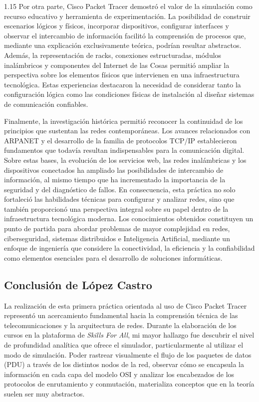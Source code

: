 \documentclass[11pt, a4paper]{article}
\begin{document}
\begin{spacing}{1.15}
Por otra parte, Cisco Packet Tracer demostró el valor de la simulación como recurso educativo y herramienta de experimentación. La posibilidad de construir escenarios lógicos y físicos, incorporar dispositivos, configurar interfaces y observar el intercambio de información facilitó la comprensión de procesos que, mediante una explicación exclusivamente teórica, podrían resultar abstractos. Además, la representación de racks, conexiones estructuradas, módulos inalámbricos y componentes del Internet de las Cosas permitió ampliar la perspectiva sobre los elementos físicos que intervienen en una infraestructura tecnológica. Estas experiencias destacaron la necesidad de considerar tanto la configuración lógica como las condiciones físicas de instalación al diseñar sistemas de comunicación confiables.

Finalmente, la investigación histórica permitió reconocer la continuidad de los principios que sustentan las redes contemporáneas. Los avances relacionados con ARPANET y el desarrollo de la familia de protocolos TCP/IP establecieron fundamentos que todavía resultan indispensables para la comunicación digital. Sobre estas bases, la evolución de los servicios web, las redes inalámbricas y los dispositivos conectados ha ampliado las posibilidades de intercambio de información, al mismo tiempo que ha incrementado la importancia de la seguridad y del diagnóstico de fallos. En consecuencia, esta práctica no solo fortaleció las habilidades técnicas para configurar y analizar redes, sino que también proporcionó una perspectiva integral sobre su papel dentro de la infraestructura tecnológica moderna. Los conocimientos obtenidos constituyen un punto de partida para abordar problemas de mayor complejidad en redes, ciberseguridad, sistemas distribuidos e Inteligencia Artificial, mediante un enfoque de ingeniería que considere la conectividad, la eficiencia y la confiabilidad como elementos esenciales para el desarrollo de soluciones informáticas.

\clearpage

\subsection{Conclusión de López Castro}

La realización de esta primera práctica orientada al uso de Cisco Packet Tracer representó un acercamiento fundamental hacia la comprensión técnica de las telecomunicaciones y la arquitectura de redes. Durante la elaboración de los cursos en la plataforma de \textit{Skills For All}, mi mayor hallazgo fue descubrir el nivel de profundidad analítica que ofrece el simulador, particularmente al utilizar el modo de simulación. Poder rastrear visualmente el flujo de los paquetes de datos (PDU) a través de los distintos nodos de la red, observar cómo se encapsula la información en cada capa del modelo OSI y analizar los encabezados de los protocolos de enrutamiento y conmutación, materializa conceptos que en la teoría suelen ser muy abstractos.


\end{spacing}
\end{document}

